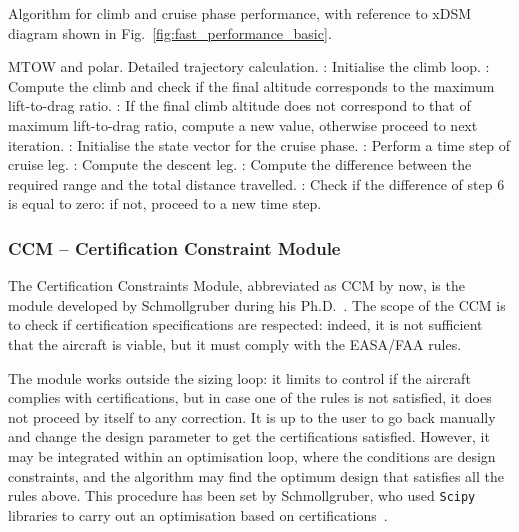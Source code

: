 \begin{algorithm}[!h]
	\caption{Algorithm for climb and cruise phase performance, with reference to xDSM diagram shown in Fig.~\ref{fig:fast_performance_basic}.}
	\label{alg:fast_performance_basic}
	\begin{algorithmic}
		\REQUIRE MTOW and polar.
		\ENSURE Detailed trajectory calculation.
		: Initialise the climb loop.
		\REPEAT
		: Compute the climb and check if the final altitude corresponds to the maximum lift-to-drag ratio.
		: If the final climb altitude does not correspond to that of maximum lift-to-drag ratio, compute a new value, otherwise proceed to next iteration.
		\REPEAT
		: Initialise the state vector for the cruise phase.
		: Perform a time step of cruise leg.
		: Compute the descent leg.
		: Compute the difference between the required range and the total distance travelled.
		: Check if the difference of step 6 is equal to zero: if not, proceed to a new time step.
	\end{algorithmic}
\end{algorithm}

\subsubsection{CCM -- Certification Constraint Module}
\label{subsubsec:chap2_ccm}

The Certification Constraints Module, abbreviated as CCM by now, is the module developed by Schmollgruber during his Ph.D.~\cite{bib:schmollgruber, bib:schmollgruber_phd}. 
The scope of the CCM is to check if certification specifications are respected: indeed, it is not sufficient that the aircraft is viable, but it must comply with the EASA/FAA rules.

The module works outside the sizing loop: it limits to control if the aircraft complies with certifications, but in case one of the rules is not satisfied, it does not proceed by itself to any correction. 
It is up to the user to go back manually and change the design parameter to get the certifications satisfied.
However, it may be integrated within an optimisation loop, where the conditions are design constraints, and the algorithm may find the optimum design that satisfies all the rules above. 
This procedure has been set by Schmollgruber, who used \texttt{Scipy} libraries to carry out an optimisation based on certifications~\cite{bib:schmollgruber_phd}.

